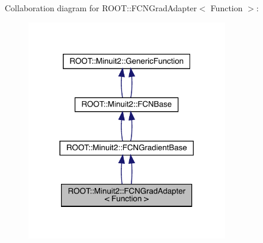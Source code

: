 Collaboration diagram for R\+O\+OT\+:\+:F\+C\+N\+Grad\+Adapter$<$ Function $>$\+:\nopagebreak
\begin{figure}[H]
\begin{center}
\leavevmode
\includegraphics[width=249pt]{d7/dd3/classROOT_1_1Minuit2_1_1FCNGradAdapter__coll__graph}
\end{center}
\end{figure}
